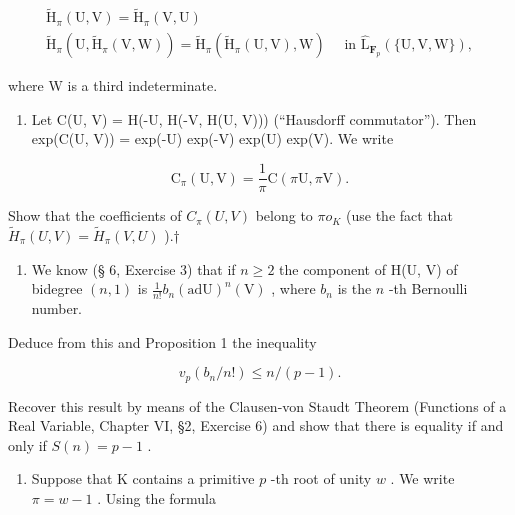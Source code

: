 \[
\begin{array}{c} \tilde {\mathrm{H}} _ {\pi} (\mathrm{U}, \mathrm{V}) = \tilde {\mathrm{H}} _ {\pi} (\mathrm{V}, \mathrm{U}) \\ \tilde {\mathrm{H}} _ {\pi} (\mathrm{U}, \tilde {\mathrm{H}} _ {\pi} (\mathrm{V}, \mathrm{W})) = \tilde {\mathrm{H}} _ {\pi} (\tilde {\mathrm{H}} _ {\pi} (\mathrm{U}, \mathrm{V}), \mathrm{W}) \quad \text { in } \hat {\mathrm{L}} _ {\mathbf {F} _ {p}} (\{\mathrm{U}, \mathrm{V}, \mathrm{W} \}), \end{array}
\]

where W is a third indeterminate.

\begin{enumerate}
\def\labelenumi{(\alph{enumi})}
\setcounter{enumi}{4}
\tightlist
\item
  Let C(U, V) = H(-U, H(-V, H(U, V))) (``Hausdorff commutator''). Then exp(C(U, V)) = exp(-U) exp(-V) exp(U) exp(V). We write
\end{enumerate}

\[
\mathrm{C} _ {\pi} (\mathrm{U}, \mathrm{V}) = \frac {1}{\pi} \mathrm{C} (\pi \mathrm{U}, \pi \mathrm{V}).
\]

Show that the coefficients of \(C_{\pi}(U,V)\) belong to \(\pi o_{K}\) (use the fact that \(\tilde{H}_{\pi}(U,V)=\tilde{H}_{\pi}(V,U)\) ).†

\begin{enumerate}
\def\labelenumi{\arabic{enumi}.}
\setcounter{enumi}{1}
\tightlist
\item
  We know (§ 6, Exercise 3) that if \(n \geqslant 2\) the component of H(U, V) of bidegree \((n, 1)\) is \(\frac{1}{n!} b_n(\mathrm{ad}\mathrm{U})^n (\mathrm{V})\) , where \(b_n\) is the \(n\) -th Bernoulli number.
\end{enumerate}

Deduce from this and Proposition 1 the inequality

\[
v _ {p} (b _ {n} / n!) \leqslant n / (p - 1).
\]

Recover this result by means of the Clausen-von Staudt Theorem (Functions of a Real Variable, Chapter VI, §2, Exercise 6) and show that there is equality if and only if \(S(n) = p - 1\) .

\begin{enumerate}
\def\labelenumi{\arabic{enumi}.}
\setcounter{enumi}{2}
\tightlist
\item
  Suppose that K contains a primitive \(p\) -th root of unity \(w\) . We write \(\pi = w - 1\) . Using the formula
\end{enumerate}

